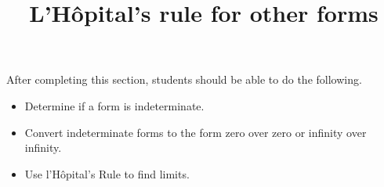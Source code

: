 \documentclass{ximera}
\title{L'H\^{o}pital's rule for other forms}
\begin{document}
\begin{abstract}
\end{abstract}

\maketitle

\begin{sectionOutcomes}

After completing this section, students should be able to do the following.

\begin{itemize}
	\item Determine if a form is indeterminate.
	\item Convert indeterminate forms to the form zero over zero
          or infinity over infinity.
	\item Use l'H\^{o}pital's Rule to find limits.
\end{itemize}

\end{sectionOutcomes}
\end{document}
